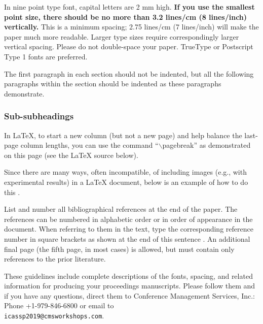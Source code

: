 \documentclass{article}
\begin{document}
In nine point type font, capital letters are 2 mm high.  {\bf If you use the
smallest point size, there should be no more than 3.2 lines/cm (8 lines/inch)
vertically.}  This is a minimum spacing; 2.75 lines/cm (7 lines/inch) will make
the paper much more readable.  Larger type sizes require correspondingly larger
vertical spacing.  Please do not double-space your paper.  TrueType or
Postscript Type 1 fonts are preferred.

The first paragraph in each section should not be indented, but all the
following paragraphs within the section should be indented as these paragraphs
demonstrate.


\subsubsection{Sub-subheadings}
\label{sssec:subsubhead}

In LaTeX, to start a new column (but not a new page) and help balance the
last-page column lengths, you can use the command ``$\backslash$pagebreak'' as
demonstrated on this page (see the LaTeX source below).



Since there are many ways, often incompatible, of including images (e.g., with
experimental results) in a LaTeX document, below is an example of how to do
this \cite{Lamp86}.

List and number all bibliographical references at the end of the
paper. The references can be numbered in alphabetic order or in
order of appearance in the document. When referring to them in
the text, type the corresponding reference number in square
brackets as shown at the end of this sentence \cite{C2,kumar2008computer}. An
additional final page (the fifth page, in most cases) is
allowed, but must contain only references to the prior
literature.

These guidelines include complete descriptions of the fonts, spacing, and
related information for producing your proceedings manuscripts. Please follow
them and if you have any questions, direct them to Conference Management
Services, Inc.: Phone +1-979-846-6800 or email
to \\\texttt{icassp2019@cmsworkshops.com}.
\end{document}
